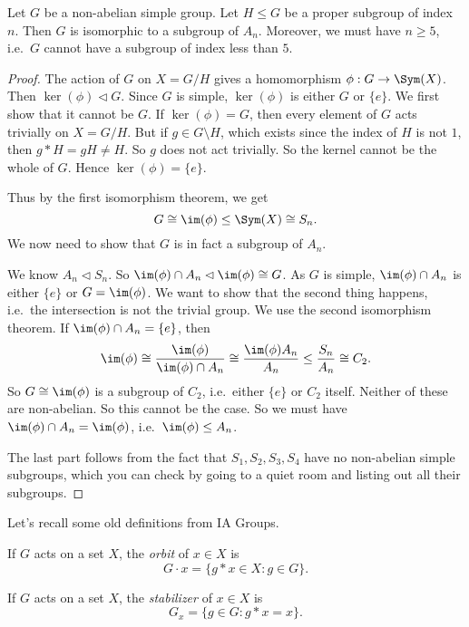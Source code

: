 \documentclass[a4paper]{article}
\begin{document}
\begin{cor}
  Let $G$ be a non-abelian simple group. Let $H \leq G$ be a proper subgroup of index $n$. Then $G$ is isomorphic to a subgroup of $A_n$. Moreover, we must have $n \geq 5$, i.e.\ $G$ cannot have a subgroup of index less than $5$.
\end{cor}

\begin{proof}
  The action of $G$ on $X = G/H$ gives a homomorphism $\phi: G \to \Sym(X)$. Then $\ker(\phi) \lhd G$. Since $G$ is simple, $\ker(\phi)$ is either $G$ or $\{e\}$. We first show that it cannot be $G$. If $\ker(\phi) = G$, then every element of $G$ acts trivially on $X = G/H$. But if $g \in G\setminus H$, which exists since the index of $H$ is not $1$, then $g * H = gH \not= H$. So $g$ does not act trivially. So the kernel cannot be the whole of $G$. Hence $\ker(\phi) = \{e\}$.

  Thus by the first isomorphism theorem, we get
  \[
    G \cong \im (\phi) \leq \Sym(X) \cong S_n.
  \]
  We now need to show that $G$ is in fact a subgroup of $A_n$.

  We know $A_n \lhd S_n$. So $\im(\phi) \cap A_n \lhd \im(\phi) \cong G$. As $G$ is simple, $\im (\phi) \cap A_n$ is either $\{e\}$ or $G = \im(\phi)$. We want to show that the second thing happens, i.e.\ the intersection is not the trivial group. We use the second isomorphism theorem. If $\im(\phi) \cap A_n = \{e\}$, then
  \[
    \im(\phi) \cong \frac{\im(\phi)}{\im(\phi) \cap A_n} \cong \frac{\im (\phi) A_n}{A_n} \leq \frac{S_n}{A_n} \cong C_2.
  \]
  So $G \cong \im (\phi)$ is a subgroup of $C_2$, i.e.\ either $\{e\}$ or $C_2$ itself. Neither of these are non-abelian. So this cannot be the case. So we must have $\im(\phi) \cap A_n = \im(\phi)$, i.e.\ $\im (\phi) \leq A_n$.

  The last part follows from the fact that $S_1, S_2, S_3, S_4$ have no non-abelian simple subgroups, which you can check by going to a quiet room and listing out all their subgroups.
\end{proof}

Let's recall some old definitions from IA Groups.
\begin{defi}[Orbit]
  If $G$ acts on a set $X$, the \emph{orbit} of $x \in X$ is
  \[
    G\cdot x = \{g * x \in X: g \in G\}.
  \]
\end{defi}

\begin{defi}[Stabilizer]
  If $G$ acts on a set $X$, the \emph{stabilizer} of $x \in X$ is
  \[
    G_x = \{g \in G: g * x = x\}.
  \]
\end{defi}
\end{document}
